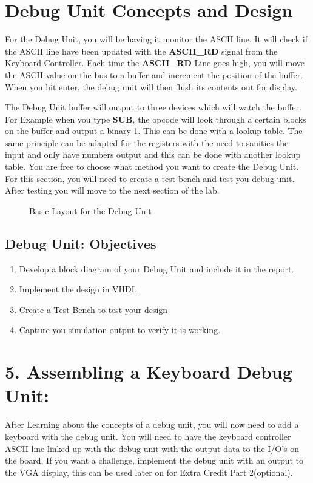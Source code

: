 \documentclass{article}
\begin{document}
\section{Debug Unit Concepts and Design}
For the Debug Unit, you will be having it monitor the ASCII line. It will check if the ASCII line have been updated with the \textbf{ASCII\_RD} signal from the Keyboard Controller. Each time the \textbf{ASCII\_RD} Line goes high, you will move the ASCII value on the bus to a buffer and increment the position of the buffer. When you hit enter, the debug unit will then flush its contents out for display.

The Debug Unit buffer will output to three devices which will watch the buffer. For Example when you type \textbf{SUB}, the opcode will look through a certain blocks on the buffer and output a binary 1. This can be done with a lookup table. The same principle can be adapted for the registers with the need to sanities the input and only have numbers output and this can be done with another lookup table. You are free to choose what method you want to create the Debug Unit. For this section, you will need to create a test bench and test you debug unit. After testing you will move to the next section of the lab.

\begin{figure}[!htbp]
  \centering
  \caption{Basic Layout for the Debug Unit}
\end{figure}

\subsection{Debug Unit: Objectives}
\begin{enumerate}
  \item Develop a block diagram of your Debug Unit and include it in the report.
  \item Implement the design in VHDL.
  \item Create a Test Bench to test your design
  \item Capture you simulation output to verify it is working.
\end{enumerate}

\newpage

\section{5. Assembling a Keyboard Debug Unit:}
After Learning about the concepts of a debug unit, you will now need to add a keyboard with the debug unit. You will need to have the keyboard controller ASCII line linked up with the debug unit with the output data to the I/O's on the board. If you want a challenge, implement the debug unit with an output to the VGA display, this can be used later on for Extra Credit Part 2(optional).
\end{document}
